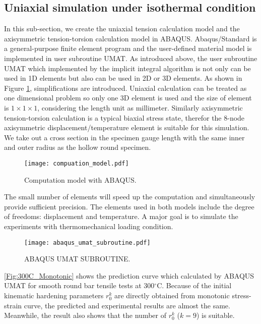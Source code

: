 \subsection{Uniaxial simulation under isothermal condition}
In this sub-section, we create the uniaxial tension calculation model and the axisymmetric tension-torsion calculation model in ABAQUS.
Abaqus/Standard is a general-purpose finite element program and the user-defined material model is implemented in user subroutine UMAT.
As introduced above, the user subroutine UMAT which implemented by the implicit integral algorithm is not only can be used in 1D elements but also can be used in 2D or 3D elements.
As shown in Figure \ref{Fig:Compuation_model}, simplifications are introduced.
Uniaxial calculation can be treated as one dimensional problem so only one 3D element is used and the size of element is $1 \times 1 \times 1$, considering the length unit as millimeter.
Similarly axisymmetric tension-torsion calculation is a typical biaxial stress state, therefor the 8-node axisymmetric displacement/temperature element is suitable for this simulation.
We take out a cross section in the specimen gauge length with the same inner and outer radius as the hollow round specimen.

\begin{figure}[!htp]
\centering
\texttt{[image: compuation\_model.pdf]}
\caption{Computation model with ABAQUS.}
\label{Fig:Compuation_model}
\end{figure}

The small number of elements will speed up the computation and simultaneously provide sufficient precision.
The elements used in both models include the degree of freedoms: displacement and temperature.
A major goal is to simulate the experiments with thermomechanical loading condition.

\begin{figure}[!htp]
\centering
\texttt{[image: abaqus\_umat\_subroutine.pdf]}
\caption{ABAQUS UMAT SUBROUTINE.}
\label{Fig:ABAQUS_UMAT_SUBROUTINE}
\end{figure}

\ref{Fig:300C_Monotonic} shows the prediction curve which calculated by ABAQUS UMAT for smooth round bar tensile tests at 300$^{\circ}$C.
Because of the initial kinematic hardening parameters $r_0^k$ are directly obtained from monotonic stress-strain curve, the predicted and experimental results are almost the same.
Meanwhile, the result also shows that the number of $r_0^k$ ($k=9$) is suitable.

